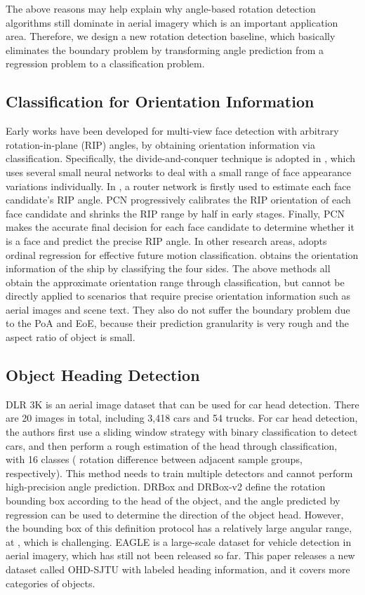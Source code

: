 \documentclass[10pt,journal,compsoc]{IEEEtran}
\begin{document}
The above reasons may help explain why angle-based rotation detection algorithms still dominate in aerial imagery which is an important application area. Therefore, we design a new rotation detection baseline, which basically eliminates the boundary problem by transforming angle prediction from a regression problem to a classification problem.

\subsection{Classification for Orientation Information} Early works have been developed for multi-view face detection with arbitrary rotation-in-plane (RIP) angles, by obtaining orientation information via classification. Specifically, the divide-and-conquer technique is adopted in \cite{huang2007high}, which uses several small neural networks to deal with a small range of face appearance variations individually. In \cite{rowley1998rotation}, a router network is firstly used to estimate each face candidate’s RIP angle. PCN \cite{shi2018real} progressively calibrates the RIP orientation of each face candidate and shrinks the RIP range by half in early stages. Finally, PCN makes the accurate final decision for each face candidate to determine whether it is a face and predict the precise RIP angle. In other research areas, \cite{kim2019instance} adopts ordinal regression for effective future motion classification. \cite{yang2018position} obtains the orientation information of the ship by classifying the four sides. 
The above methods all obtain the approximate orientation range through classification, but cannot be directly applied to scenarios that require precise orientation information such as aerial images and scene text. They also do not suffer the boundary problem due to the PoA and EoE, because their prediction granularity is very rough and the aspect ratio of object is small.

\subsection{Object Heading Detection} 
DLR 3K \cite{liu2015fast} is an aerial image dataset that can be used for car head detection. There are 20 images in total, including 3,418 cars and 54 trucks. For car head detection, the authors first use a sliding window strategy with binary classification to detect cars, and then perform a rough estimation of the head through classification, with 16 classes ( rotation difference between adjacent sample groups, respectively). This method needs to train multiple detectors and cannot perform high-precision angle prediction. DRBox \cite{liu2017learning} and DRBox-v2 \cite{an2019drbox} define the rotation bounding box according to the head of the object, and the angle predicted by regression can be used to determine the direction of the object head. However, the bounding box of this definition protocol has a relatively large angular range, at , which is challenging. EAGLE \cite{azimi2021eagle} is a large-scale dataset for vehicle detection in aerial imagery, which has still not been released so far. This paper releases a new dataset  called OHD-SJTU with labeled heading information, and it covers more categories of objects.
\end{document}
